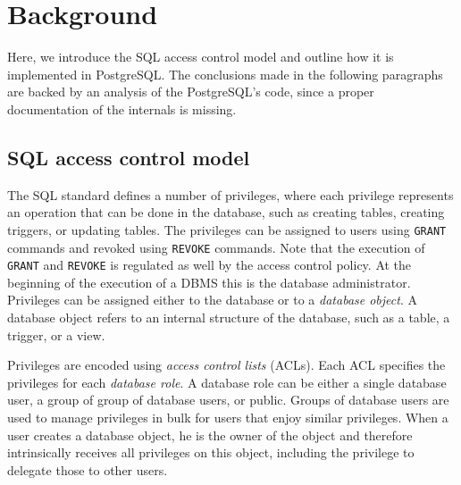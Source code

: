 \section{Background}

Here, we introduce the SQL access control model and outline how it is implemented in PostgreSQL.
%
The conclusions made in the following paragraphs are backed by an analysis of the  PostgreSQL's code, since a proper documentation of the internals is missing.

\subsection{SQL access control model}

The SQL standard defines a number of privileges, where each privilege represents an operation that can be done in the database, such as creating tables, creating triggers, or updating tables.
%
The privileges can be assigned to users using \texttt{GRANT} commands and revoked using \texttt{REVOKE} commands.
%
Note that the execution of  \texttt{GRANT} and \texttt{REVOKE} is regulated as well by the access control policy. %
%
At the beginning of the execution of a DBMS this is the database administrator. 
%
Privileges can be assigned either to the database or to a \emph{database object}. 
%
A database object refers to an internal structure of the database, such as a table, a trigger, or a view. 
%

Privileges are encoded using \emph{access control lists} (ACLs).  
%
Each ACL specifies the privileges for each \emph{database role}. 
%
A database role can be either a single database user, a group of group of database users, or public.  
%
Groups of database users are used to manage privileges in bulk for users that enjoy similar privileges.
%
When a user creates a database object, he is the owner of the object and therefore intrinsically receives all privileges on this object, including the privilege to delegate those to other users.

